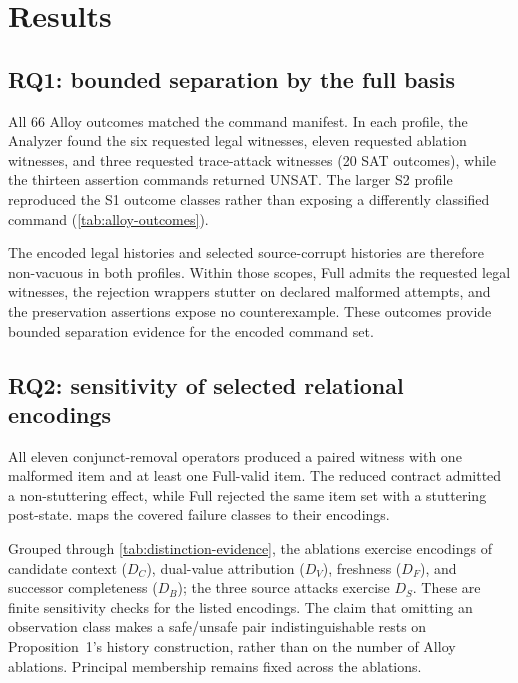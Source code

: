 \section{Results}
\label{sec:results}

\subsection{RQ1: bounded separation by the full basis}

All 66 Alloy outcomes matched the command manifest. In each profile, the Analyzer found the six requested legal witnesses, eleven requested ablation witnesses, and three requested trace-attack witnesses (20 SAT outcomes), while the thirteen assertion commands returned UNSAT. The larger S2 profile reproduced the S1 outcome classes rather than exposing a differently classified command (\cref{tab:alloy-outcomes}).

The encoded legal histories and selected source-corrupt histories are therefore non-vacuous in both profiles. Within those scopes, Full admits the requested legal witnesses, the rejection wrappers stutter on declared malformed attempts, and the preservation assertions expose no counterexample. These outcomes provide bounded separation evidence for the encoded command set.

\subsection{RQ2: sensitivity of selected relational encodings}

All eleven conjunct-removal operators produced a paired witness with one malformed item and at least one Full-valid item. The reduced contract admitted a non-stuttering effect, while Full rejected the same item set with a stuttering post-state.  maps the covered failure classes to their encodings.

Grouped through \cref{tab:distinction-evidence}, the ablations exercise encodings of candidate context ($D_C$), dual-value attribution ($D_V$), freshness ($D_F$), and successor completeness ($D_B$); the three source attacks exercise $D_S$. These are finite sensitivity checks for the listed encodings. The claim that omitting an observation class makes a safe/unsafe pair indistinguishable rests on Proposition~1's history construction, rather than on the number of Alloy ablations. Principal membership remains fixed across the ablations.

